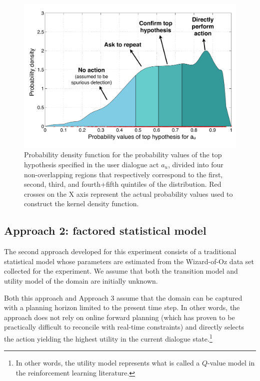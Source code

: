 \begin{figure}[h!]
\centering
\includegraphics[scale=0.45]{imgs/asrconfidence.pdf} 
\caption{Probability density function for the probability values of the top hypothesis specified in the user dialogue act $a_u$, divided into four non-overlapping regions that respectively correspond to the first, second, third, and fourth+fifth quintiles of the distribution. Red crosses on the X axis represent the actual probability values used to construct the kernel density function. }
\label{fig:asrconfidence-exp3}
\end{figure}


\subsection{Approach 2: factored statistical model}

The second approach developed for this experiment consists of a traditional statistical model whose parameters are estimated from the Wizard-of-Oz data set collected for the experiment.   We assume that both the transition model and utility model of the domain are initially unknown. 

Both this approach and Approach 3 assume that the domain can be captured with a planning horizon limited to the present time step.  In other words, the approach does not rely on online forward planning (which has proven to be practically difficult to reconcile with real-time constraints) and directly selects the action yielding the highest utility in the current dialogue state.\footnote{In other words, the utility model represents what is called a $Q$-value model in the reinforcement learning literature.}

